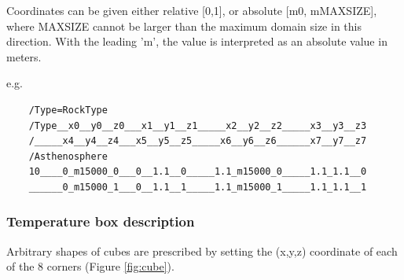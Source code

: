 Coordinates can be given either relative [0,1], or absolute [m0, mMAXSIZE], where MAXSIZE cannot be larger than the maximum domain size in this direction. With the leading 'm', the value is interpreted as an absolute value in meters.

e.g.
\lstset{basicstyle=\footnotesize}
\begin{lstlisting}
	/Type=RockType
	/Type__x0__y0__z0___x1__y1__z1_____x2__y2__z2_____x3__y3__z3
	/_____x4__y4__z4___x5__y5__z5_____x6__y6__z6______x7__y7__z7
	/Asthenosphere
	10____0_m15000_0___0__1.1__0_____1.1_m15000_0_____1.1_1.1__0
	______0_m15000_1___0__1.1__1_____1.1_m15000_1_____1.1_1.1__1
\end{lstlisting}

\subsubsection{Temperature box description}
Arbitrary shapes of cubes are prescribed by setting the (x,y,z) coordinate of each of the 8 corners (Figure \ref{fig:cube}).

